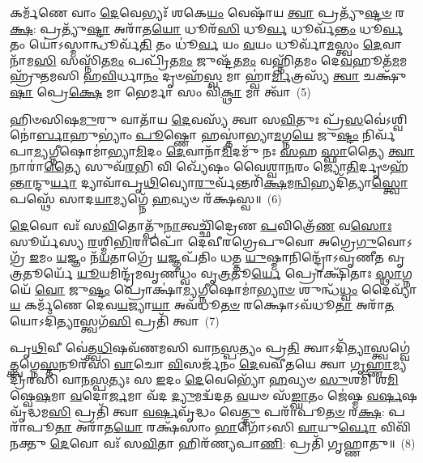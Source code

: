 {\anuvakamend[{𑌸𑍋𑌮𑍇᳴\-\ul{𑌨𑌾}\-𑌷𑍍𑌟𑍗 𑌚᳴}]}

𑌕𑌰𑍍𑌮᳴𑌣𑍇 𑌵𑌾𑌂 \ul{𑌦𑍇}\-𑌵𑍇𑌭𑍍𑌯𑌃᳴ 𑌶𑌕𑍇\-\ul{𑌯𑌂} 𑌵𑍇𑌷𑌾᳴𑌯 \ul{𑌤𑍍𑌵𑌾} 𑌪𑍍𑌰𑌤𑍍𑌯𑍁᳴\-\ul{𑌷𑍍𑌟}\-\-\ul{𑍞} 𑌰\-\ul{𑌕𑍍𑌷}\-: 𑌪𑍍𑌰𑌤𑍍𑌯𑍁᳴\-\ul{𑌷𑍍𑌟𑌾} 𑌅𑌰𑌾᳴𑌤\-\ul{𑌯𑍋} 𑌧𑍂𑌰᳴\-\ul{𑌸𑌿} 𑌧𑍂\-\ul{𑌰𑍍𑌵} 𑌧𑍂𑌰𑍍𑌵᳴\-\ul{𑌨𑍍𑌤𑌂} 𑌧𑍂\-\ul{𑌰𑍍𑌵} 𑌤𑌂 𑌯𑍋॑\-𑌽𑌸𑍍𑌮𑌾𑌨𑍍𑌧𑍂𑌰𑍍𑌵᳴\-\ul{𑌤𑌿} 𑌤𑌂 𑌧𑍂॑\-\ul{𑌰𑍍𑌵} 𑌯𑌂 \ul{𑌵}\-𑌯𑌂 𑌧𑍂𑌰𑍍𑌵𑌾᳴\-\ul{𑌮}\-𑌸𑍍𑌤𑍍𑌵𑌂 \ul{𑌦𑍇}\-𑌵𑌾𑌨𑌾᳴𑌮\-\ul{𑌸𑌿} 𑌸𑌸𑍍𑌨𑌿᳴𑌤\-\ul{𑌮𑌂} 𑌪𑌪𑍍𑌰𑌿᳴𑌤\-\ul{𑌮𑌂} 𑌜𑍁𑌷𑍍𑌟᳴𑌤\-\ul{𑌮𑌂} 𑌵𑌹𑍍𑌨𑌿᳴𑌤𑌮𑌂 𑌦𑍇\-\ul{𑌵}\-𑌹𑍂𑌤᳴\-\ul{𑌮}\-𑌮𑌹𑍍𑌰𑍁᳴𑌤𑌮𑌸𑌿 𑌹\-\ul{𑌵𑌿}\-𑌰𑍍𑌧𑌾\-\ul{𑌨𑌂} 𑌦𑍃𑍞𑌹᳴\-\ul{𑌸𑍍𑌵} 𑌮𑌾 𑌹𑍍𑌵𑌾॑\-\ul{𑌰𑍍𑌮𑌿}\-𑌤𑍍𑌰𑌸𑍍𑌯᳴ \ul{𑌤𑍍𑌵𑌾} 𑌚𑌕𑍍𑌷𑍁᳴\-\ul{𑌷𑌾} 𑌪𑍍𑌰𑍇\-\ul{𑌕𑍍𑌷𑍇} 𑌮𑌾 𑌭𑍇𑌰𑍍𑌮𑌾 𑌸𑌂 𑌵𑌿᳴\-\ul{𑌕𑍍𑌥𑌾} 𑌮𑌾 𑌤𑍍𑌵𑌾᳴~(5)

𑌹𑌿𑍞𑌸𑌿𑌷\-\ul{𑌮𑍁}\-𑌰𑍁 𑌵𑌾𑌤𑌾᳴𑌯 \ul{𑌦𑍇}\-𑌵𑌸𑍍𑌯᳴ 𑌤𑍍𑌵𑌾 𑌸\-\ul{𑌵𑌿}\-𑌤𑍁𑌃 𑌪𑍍𑌰᳴\-\ul{𑌸}\-𑌵𑍇॑\-𑌽𑌶𑍍𑌵𑌿𑌨𑍋॑\-\ul{𑌰𑍍𑌬𑌾}\-𑌹𑍁\-𑌭𑍍𑌯𑌾𑌂॑ \ul{𑌪𑍂}\-𑌷𑍍𑌣𑍋 𑌹𑌸𑍍𑌤𑌾॑𑌭𑍍𑌯𑌾\-\ul{𑌮}\-𑌗𑍍𑌨\-\ul{𑌯𑍇} 𑌜𑍁\-\ul{𑌷𑍍𑌟𑌂} 𑌨𑌿𑌰𑍍𑌵᳴𑌪𑌾\-\ul{𑌮𑍍𑌯}\-𑌗𑍍𑌨𑍀\-𑌷𑍋𑌮𑌾॑𑌭𑍍𑌯𑌾\-\ul{𑌮𑌿}\-𑌦𑌂 \ul{𑌦𑍇}\-𑌵𑌾𑌨𑌾᳴\-\ul{𑌮𑌿}\-𑌦𑌮𑍁᳴ 𑌨𑌃 \ul{𑌸}\-𑌹 \ul{𑌸𑍍𑌫𑌾}\-𑌤𑍍𑌯𑍈 \ul{𑌤𑍍𑌵𑌾} 𑌨𑌾𑌰𑌾॑\-\ul{𑌤𑍍𑌯𑍈} 𑌸𑍁𑌵᳴\-\ul{𑌰}\-𑌭𑌿 𑌵𑌿 𑌖𑍍𑌯𑍇᳴𑌷𑌂 𑌵𑍈𑌶𑍍𑌵𑌾\-\ul{𑌨}\-𑌰𑌂 𑌜𑍍𑌯𑍋\-\ul{𑌤𑌿}\-𑌰𑍍𑌦𑍃𑍞𑌹᳴\-\ul{𑌨𑍍𑌤𑌾}\-𑌨𑍍𑌦𑍁\-\ul{𑌰𑍍𑌯𑌾} 𑌦𑍍𑌯𑌾𑌵𑌾᳴𑌪𑍃\-\ul{𑌥𑌿}\-𑌵𑍍𑌯𑍋\-\ul{𑌰𑍁}\-𑌰𑍍𑌵᳴𑌨𑍍𑌤𑌰𑌿᳴\-\ul{𑌕𑍍𑌷}\-𑌮\-\ul{𑌨𑍍𑌵𑌿}\-𑌹𑍍𑌯𑌦𑌿᳴𑌤𑍍𑌯𑌾\-\ul{𑌸𑍍𑌤𑍍𑌵𑍋}\-𑌪𑌸𑍍𑌥𑍇᳴ 𑌸𑌾𑌦\-\ul{𑌯𑌾}\-𑌮𑍍𑌯𑌗𑍍𑌨𑍇᳴ \ul{𑌹}\-𑌵𑍍𑌯𑍞 𑌰᳴𑌕𑍍𑌷𑌸𑍍𑌵॥~(6)

{\anuvakamend[{𑌮𑌾 \ul{𑌤𑍍𑌵𑌾} 𑌷𑌟𑍍𑌚᳴𑌤𑍍𑌵𑌾𑌰𑌿𑍞𑌶𑌚𑍍𑌚}]}

\-\ul{𑌦𑍇}\-𑌵𑍋 𑌵𑌃᳴ 𑌸\-\ul{𑌵𑌿}\-𑌤𑍋𑌤𑍍𑌪𑍁᳴\-\ul{𑌨𑌾}\-𑌤𑍍𑌵𑌚𑍍𑌛𑌿᳴𑌦𑍍𑌰𑍇𑌣 \ul{𑌪}\-𑌵𑌿𑌤𑍍𑌰𑍇᳴\-\ul{𑌣} 𑌵\-\ul{𑌸𑍋𑌃} 𑌸𑍂𑌰𑍍𑌯᳴𑌸𑍍𑌯 \ul{𑌰}\-𑌶𑍍𑌮𑌿\-\ul{𑌭𑌿}\-𑌰𑌾𑌪𑍋᳴ 𑌦𑍇𑌵𑍀𑌰𑌗𑍍𑌰𑍇𑌪𑍁𑌵𑍋 𑌅𑌗𑍍𑌰𑍇\-\ul{𑌗𑍁}\-𑌵𑍋\-𑌽𑌗𑍍𑌰᳴ \ul{𑌇}\-𑌮𑌂 \ul{𑌯}\-𑌜𑍍𑌞𑌂 𑌨᳴\-\ul{𑌯}\-𑌤𑌾𑌗𑍍𑌰𑍇᳴ \ul{𑌯}\-𑌜𑍍𑌞𑌪᳴𑌤𑌿𑌂 𑌧𑌤𑍍𑌤 \ul{𑌯𑍁}\-𑌷𑍍𑌮𑌾𑌨𑌿𑌨𑍍𑌦𑍍𑌰𑍋᳴\-𑌽𑌵𑍃𑌣𑍀𑌤 𑌵𑍃\-\ul{𑌤𑍍𑌰}\-𑌤𑍂𑌰𑍍𑌯𑍇᳴ \ul{𑌯𑍂}\-𑌯𑌮𑌿𑌨𑍍𑌦𑍍𑌰᳴𑌮𑌵𑍃𑌣𑍀𑌧𑍍𑌵𑌂 𑌵𑍃\-\ul{𑌤𑍍𑌰}\-𑌤𑍂\-\ul{𑌰𑍍𑌯𑍇} 𑌪𑍍𑌰𑍋𑌕𑍍𑌷𑌿᳴𑌤𑌾𑌃 \ul{𑌸𑍍𑌥𑌾}\-𑌗𑍍𑌨𑌯𑍇᳴ \ul{𑌵𑍋} 𑌜𑍁\-\ul{𑌷𑍍𑌟𑌂} 𑌪𑍍𑌰𑍋𑌕𑍍𑌷𑌾॑\-\ul{𑌮𑍍𑌯}\-𑌗𑍍𑌨𑍀𑌷𑍋𑌮𑌾॑\-\ul{𑌭𑍍𑌯𑌾}\-\-\ul{𑍞} 𑌶𑍁𑌨𑍍𑌧᳴\-\ul{𑌧𑍍𑌵𑌂} 𑌦𑍈𑌵𑍍𑌯𑌾᳴\-\ul{𑌯} 𑌕𑌰𑍍𑌮᳴𑌣𑍇 𑌦𑍇𑌵\-\ul{𑌯}\-𑌜𑍍𑌯𑌾\-\ul{𑌯𑌾} 𑌅𑌵᳴𑌧𑍂\-\ul{𑌤}\-\-\ul{𑍞} 𑌰𑌕𑍍𑌷𑍋\-𑌽𑌵᳴𑌧𑍂\-\ul{𑌤𑌾} 𑌅𑌰𑌾᳴\-\ul{𑌤}\-𑌯𑍋\-𑌽𑌦𑌿᳴\-\ul{𑌤𑍍𑌯𑌾}\-𑌸𑍍𑌤𑍍𑌵𑌗᳴\-\ul{𑌸𑌿} 𑌪𑍍𑌰𑌤𑌿᳴ 𑌤𑍍𑌵𑌾~(7)

𑌪𑍃\-\ul{𑌥𑌿}\-𑌵𑍀 𑌵𑍇॑𑌤𑍍𑌤𑍍𑌵\-\ul{𑌧𑌿}\-𑌷𑌵᳴𑌣𑌮𑌸𑌿 𑌵𑌾𑌨\-\ul{𑌸𑍍𑌪}\-𑌤𑍍𑌯𑌂 𑌪𑍍𑌰\-\ul{𑌤𑌿} 𑌤𑍍𑌵𑌾\-𑌽𑌦𑌿᳴\-\ul{𑌤𑍍𑌯𑌾}\-𑌸𑍍𑌤𑍍𑌵𑌗𑍍𑌵𑍇॑\-\ul{𑌤𑍍𑌤𑍍𑌵}\-𑌗𑍍𑌨𑍇\-\ul{𑌸𑍍𑌤}\-𑌨𑍂𑌰᳴𑌸𑌿 \ul{𑌵𑌾}\-𑌚𑍋 \ul{𑌵𑌿}\-𑌸𑌰𑍍𑌜᳴𑌨𑌂 \ul{𑌦𑍇}\-𑌵𑌵𑍀᳴𑌤𑌯𑍇 𑌤𑍍𑌵𑌾 𑌗𑍃\-\ul{𑌹𑍍𑌣𑌾}\-𑌮𑍍𑌯𑌦𑍍𑌰𑌿᳴𑌰𑌸𑌿 𑌵𑌾𑌨\-\ul{𑌸𑍍𑌪}\-𑌤𑍍𑌯𑌃 𑌸 \ul{𑌇}\-𑌦𑌂 \ul{𑌦𑍇}\-𑌵𑍇𑌭𑍍𑌯𑍋᳴ \ul{𑌹}\-𑌵𑍍𑌯𑍞 \ul{𑌸𑍁}\-𑌶𑌮𑌿᳴ 𑌶\-\ul{𑌮𑌿}\-𑌷𑍍𑌵𑍇\-\ul{𑌷}\-𑌮𑌾 \ul{𑌵}\-𑌦𑍋\-\ul{𑌰𑍍𑌜}\-𑌮𑌾 𑌵᳴𑌦 \ul{𑌦𑍍𑌯𑍁}\-𑌮𑌦𑍍𑌵᳴𑌦𑌤 \ul{𑌵}\-𑌯𑍞 𑌸᳴\-\ul{𑌙𑍍𑌘𑌾}\-𑌤𑌂 𑌜𑍇॑𑌷𑍍𑌮 \ul{𑌵}\-\-\ul{𑌰𑍍}\-𑌷𑌵𑍃᳴𑌦𑍍𑌧𑌮\-\ul{𑌸𑌿} 𑌪𑍍𑌰𑌤𑌿᳴ 𑌤𑍍𑌵𑌾 \ul{𑌵}\-\-\ul{𑌰𑍍}\-𑌷𑌵𑍃᳴𑌦𑍍𑌧𑌂 𑌵𑍇\-\ul{𑌤𑍍𑌤𑍁} 𑌪𑌰𑌾᳴𑌪𑍂\-\ul{𑌤}\-\-\ul{𑍞} 𑌰\-\ul{𑌕𑍍𑌷}\-: 𑌪𑌰𑌾᳴𑌪𑍂\-\ul{𑌤𑌾} 𑌅𑌰𑌾᳴𑌤\-\ul{𑌯𑍋} 𑌰𑌕𑍍𑌷᳴𑌸𑌾𑌂 \ul{𑌭𑌾}\-𑌗𑍋᳴\-𑌽𑌸𑌿 \ul{𑌵𑌾}\-𑌯𑍁\-\ul{𑌰𑍍𑌵𑍋} 𑌵𑌿𑌵𑌿᳴𑌨𑌕𑍍𑌤𑍁 \ul{𑌦𑍇}\-𑌵𑍋 𑌵𑌃᳴ 𑌸\-\ul{𑌵𑌿}\-𑌤𑌾 𑌹𑌿𑌰᳴𑌣𑍍𑌯𑌪𑌾\-\ul{𑌣𑌿}\-: 𑌪𑍍𑌰𑌤𑌿᳴ 𑌗𑍃𑌹𑍍𑌣𑌾𑌤𑍁॥~(8)

